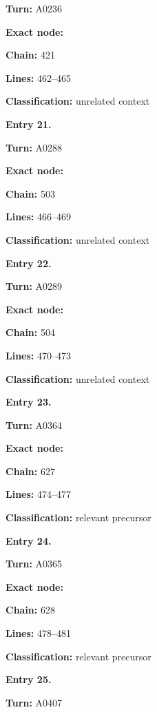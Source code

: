\textbf{Turn:} A0236

\textbf{Exact node:} \protect{}

\textbf{Chain:} 421

\textbf{Lines:} 462--465

\textbf{Classification:} unrelated context


\textbf{Entry 21.}

\textbf{Turn:} A0288

\textbf{Exact node:} \protect{}

\textbf{Chain:} 503

\textbf{Lines:} 466--469

\textbf{Classification:} unrelated context


\textbf{Entry 22.}

\textbf{Turn:} A0289

\textbf{Exact node:} \protect{}

\textbf{Chain:} 504

\textbf{Lines:} 470--473

\textbf{Classification:} unrelated context


\textbf{Entry 23.}

\textbf{Turn:} A0364

\textbf{Exact node:} \protect{}

\textbf{Chain:} 627

\textbf{Lines:} 474--477

\textbf{Classification:} relevant precursor


\textbf{Entry 24.}

\textbf{Turn:} A0365

\textbf{Exact node:} \protect{}

\textbf{Chain:} 628

\textbf{Lines:} 478--481

\textbf{Classification:} relevant precursor


\textbf{Entry 25.}

\textbf{Turn:} A0407

